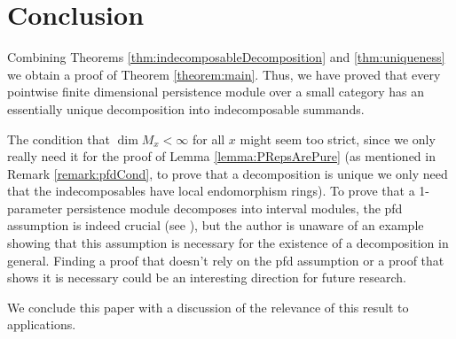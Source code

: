 \chapter{Conclusion}\label{chap:conclusion}
Combining Theorems \ref{thm:indecomposableDecomposition} and \ref{thm:uniqueness} we obtain a proof of Theorem \ref{theorem:main}.
Thus, we have proved that every pointwise finite dimensional persistence module over a small category has an essentially unique decomposition into indecomposable summands.

The condition that $\dim M_x<\infty$ for all $x$ might seem too strict, since we only really need it for the proof of Lemma \ref{lemma:PRepsArePure} (as mentioned in Remark \ref{remark:pfdCond}, to prove that a decomposition is unique we only need that the indecomposables have local endomorphism rings).
To prove that a 1-parameter persistence module decomposes into interval modules, the pfd assumption is indeed crucial (see \cite[Example 1.8]{botnan_2015}), but the author is unaware of an example showing that this assumption is necessary for the existence of a decomposition in general.
Finding a proof that doesn't rely on the pfd assumption or a proof that shows it is necessary could be an interesting direction for future research.

We conclude this paper with a discussion of the relevance of this result to applications.


